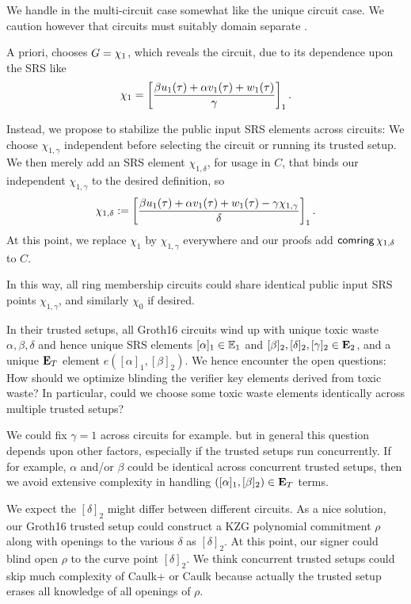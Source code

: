 We handle \comring in the multi-circuit case somewhat like the
unique circuit case.  We caution however that circuits must suitably domain
separate \comring.

\smallskip

A priori, \pifast chooses $G = \chi_1$, which reveals the circuit,
due to its dependence upon the SRS like
$$ \chi_1 = \left[ {\beta u_1(\tau) + \alpha v_1(\tau) + w_1(\tau) \over \gamma} \right]_1 . $$

Instead, we propose to stabilize the public input SRS elements across circuits:
We choose $\chi_{1,\gamma}$ independent before selecting the circuit
or running its trusted setup.
We then merely add an SRS element $\chi_{1,\delta}$, for usage in $C$, that binds
our independent $\chi_{1,\gamma}$ to the desired definition, so
$$ \chi_{1,\delta} := \left[ {\beta u_1(\tau) + \alpha v_1(\tau) + w_1(\tau) - \gamma \chi_{1,\gamma} \over \delta} \right]_1 . $$
At this point, we replace $\chi_1$ by $\chi_{1,\gamma}$ everywhere and
our proofs add $\mathsf{comring} \, \chi_{1,\delta}$ to $C$.

In this way, all ring membership circuits could share identical
public input SRS points $\chi_{1,\gamma}$, and similarly $\chi_0$ if desired.

\smallskip

In their trusted setups, all Groth16 circuits wind up with unique
toxic waste $\alpha,\beta,\delta$ and hence unique SRS elements
$[\alpha]_1 \in {\mathbb{E}}_1$ and $[\beta]_2, [\delta]_2, [\gamma]_2 \in {\mathbf{E}}_2$,
and a unique ${\mathbf{E}}_T$ element $e([\alpha]_1, [\beta]_2)$.
We hence encounter the open questions:
How should we optimize blinding the verifier key elements derived from toxic waste?
In particular, could we choose some toxic waste elements identically across multiple trusted setups?

We could fix $\gamma=1$ across circuits for example. but in general
this question depends upon other factors, especially if the trusted setups
run concurrently.
If for example, $\alpha$ and/or $\beta$ could be identical across
concurrent trusted setups, then we avoid extensive complexity in
 handling $([\alpha]_1, [\beta]_2) \in {\mathbf{E}}_T$ terms.

We expect the $[\delta]_2$ might differ between different circuits.
As a nice solution, our Groth16 trusted setup could construct a
KZG polynomial commitment $\rho$ along with openings to the
various $\delta$ as $[\delta]_2$.  At this point, our signer could
blind open $\rho$ to the curve point $[\delta]_2$.
We think concurrent trusted setups could skip much complexity of
Caulk+ \cite{caulk+} or Caulk \cite{caulk} because actually the
 trusted setup erases all knowledge of all openings of $\rho$.

\endinput



\subsection{Post-quantum}





\subsection{SnarkPack}

TODO: Handle $\pi$ hashes?


